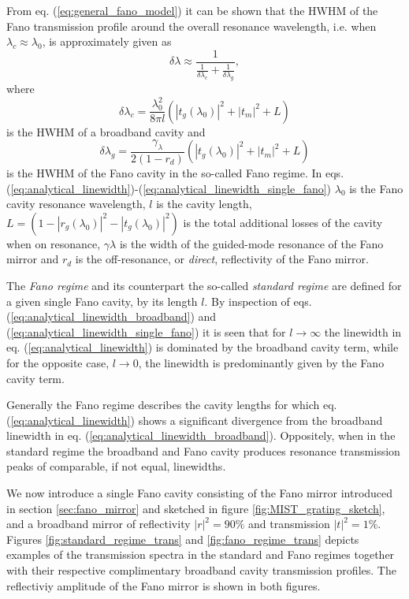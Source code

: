 From eq. (\ref{eq:general_fano_model}) it can be shown that the HWHM of the Fano transmission profile around the overall resonance wavelength, i.e. when $\lambda_c \approx \lambda_0$, is approximately given as
\begin{equation}
    \delta \lambda \approx \frac{1}{\frac{1}{\delta \lambda_c} + \frac{1}{\delta \lambda_g}},
    \label{eq:analytical_linewidth}
\end{equation}
where 
\begin{equation}
    \delta \lambda_c = \frac{\lambda_0^2}{8 \pi l} (|t_g(\lambda_0)|^2 + |t_m|^2 + L)
    \label{eq:analytical_linewidth_broadband}
\end{equation}
is the HWHM of a broadband cavity and
\begin{equation}
    \delta \lambda_g = \frac{\gamma_{\lambda}}{2 (1-r_d)}(|t_g(\lambda_0)|^2 + |t_m|^2 + L)
    \label{eq:analytical_linewidth_single_fano}
\end{equation}
is the HWHM of the Fano cavity in the so-called Fano regime.\cite{Mitra}\cite{Darki} In eqs. (\ref{eq:analytical_linewidth})-(\ref{eq:analytical_linewidth_single_fano}) $\lambda_0$ is the Fano cavity resonance wavelength, $l$ is the cavity length, $L = \left(1 - |r_g(\lambda_0)|^2 - |t_g(\lambda_0)|^2\right)$ is the total additional losses of the cavity when on resonance, $\gamma \lambda$ is the width of the guided-mode resonance of the Fano mirror and $r_d$ is the off-resonance, or \emph{direct}, reflectivity of the Fano mirror.

The \emph{Fano regime} and its counterpart the so-called \emph{standard regime} are defined for a given single Fano cavity, by its length $l$. By inspection of eqs. (\ref{eq:analytical_linewidth_broadband}) and (\ref{eq:analytical_linewidth_single_fano}) it is seen that for $l \rightarrow \infty$ the linewidth in eq. (\ref{eq:analytical_linewidth}) is dominated by the broadband cavity term, while for the opposite case, $l \rightarrow 0$, the linewidth is predominantly given by the Fano cavity term. 

Generally the Fano regime describes the cavity lengths for which eq. (\ref{eq:analytical_linewidth}) shows a significant divergence from the broadband linewidth in eq. (\ref{eq:analytical_linewidth_broadband}). Oppositely, when in the standard regime the broadband and Fano cavity produces resonance transmission peaks of comparable, if not equal, linewidths.

We now introduce a single Fano cavity consisting of the Fano mirror introduced in section \ref{sec:fano_mirror} and sketched in figure \ref{fig:MIST_grating_sketch}, and a broadband mirror of reflectivity $|r|^2=90\%$ and transmission $|t|^2=1\%$. Figures \ref{fig:standard_regime_trans} and \ref{fig:fano_regime_trans} depicts examples of the transmission spectra in the standard and Fano regimes together with their respective complimentary broadband cavity transmission profiles. The reflectiviy amplitude of the Fano mirror is shown in both figures.

